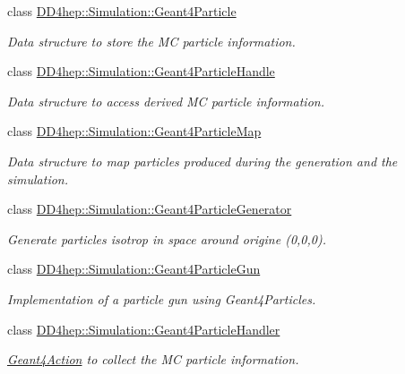 \begin{DoxyCompactItemize}
class \hyperlink{class_d_d4hep_1_1_simulation_1_1_geant4_particle}{DD4hep::Simulation::Geant4Particle}
\begin{DoxyCompactList}\small\item\em Data structure to store the MC particle information. \item\end{DoxyCompactList}\item 
class \hyperlink{class_d_d4hep_1_1_simulation_1_1_geant4_particle_handle}{DD4hep::Simulation::Geant4ParticleHandle}
\begin{DoxyCompactList}\small\item\em Data structure to access derived MC particle information. \item\end{DoxyCompactList}\item 
class \hyperlink{class_d_d4hep_1_1_simulation_1_1_geant4_particle_map}{DD4hep::Simulation::Geant4ParticleMap}
\begin{DoxyCompactList}\small\item\em Data structure to map particles produced during the generation and the simulation. \item\end{DoxyCompactList}\item 
class \hyperlink{class_d_d4hep_1_1_simulation_1_1_geant4_particle_generator}{DD4hep::Simulation::Geant4ParticleGenerator}
\begin{DoxyCompactList}\small\item\em Generate particles isotrop in space around origine (0,0,0). \item\end{DoxyCompactList}\item 
class \hyperlink{class_d_d4hep_1_1_simulation_1_1_geant4_particle_gun}{DD4hep::Simulation::Geant4ParticleGun}
\begin{DoxyCompactList}\small\item\em Implementation of a particle gun using Geant4Particles. \item\end{DoxyCompactList}\item 
class \hyperlink{class_d_d4hep_1_1_simulation_1_1_geant4_particle_handler}{DD4hep::Simulation::Geant4ParticleHandler}
\begin{DoxyCompactList}\small\item\em \hyperlink{class_d_d4hep_1_1_simulation_1_1_geant4_action}{Geant4Action} to collect the MC particle information. \item\end{DoxyCompactList}\item 

\end{DoxyCompactItemize}
